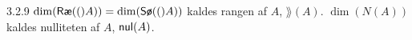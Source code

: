 %

\begin{notation}{3.2.9}
	$\dim(\row(A)) = \dim(\sor(A))$ kaldes rangen af $A$, $\rang(A)$.
	$\dim(N(A))$ kaldes nulliteten af $A$, $\nul(A)$.
\end{notation}
